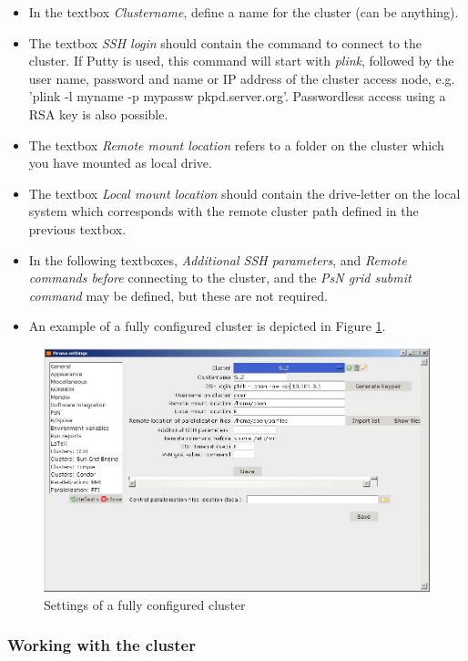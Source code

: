 \begin{itemize}
\item In the textbox \emph{Clustername}, define a name for the cluster
  (can be anything).
\item The textbox \emph{SSH login} should contain the command to
  connect to the cluster. If Putty is used, this command will start
  with \emph{plink}, followed by the user name, password and name or
  IP address of the cluster access node, e.g. 'plink -l myname -p
  mypassw pkpd.server.org'. Passwordless access using a RSA key is
  also possible.
\item The textbox \emph{Remote mount location} refers to a folder on
  the cluster which you have mounted as local drive.
\item The textbox \emph{Local mount location} should contain the
  drive-letter on the local system which corresponds with the remote
  cluster path defined in the previous textbox.
\item In the following textboxes, \emph{Additional SSH parameters},
  and \emph{Remote commands before} connecting to the cluster, and the
  \emph{PsN grid submit command} may be defined, but these are not
  required.
\item  An example of a fully configured cluster is depicted in Figure  \ref{fig:Fig3}.
\end{itemize}

\begin{figure}[h] \centering
    \includegraphics[scale=.4]{images/cluster_3b.JPG}
    \caption{Settings of a fully configured cluster\label{fig:Fig3}
}
\end{figure}

\subsubsection*{Working with the cluster}


